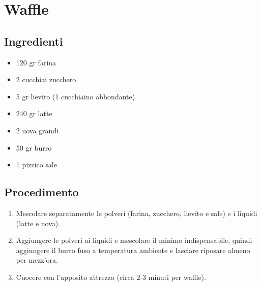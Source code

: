 \section{Waffle}
\subsection{Ingredienti}
\begin{itemize}
\item 120 gr farina  
\item 2 cucchiai zucchero  
\item 5 gr lievito (1 cucchiaino abbondante)  
\item 240 gr latte  
\item 2 uova grandi  
\item 50 gr burro   
\item 1 pizzico sale
\end{itemize}
\subsection{Procedimento}
\begin{enumerate}
\item  Mescolare separatamente le polveri (farina, zucchero, lievito e sale) e i liquidi (latte e uova).  
\item  Aggiungere le polveri ai liquidi e mescolare il minimo indispensabile, quindi aggiungere il burro fuso a temperatura ambiente e lasciare riposare almeno per mezz'ora.  
\item  Cuocere con l'apposito attrezzo (circa 2-3 minuti per waffle).
\end{enumerate}
